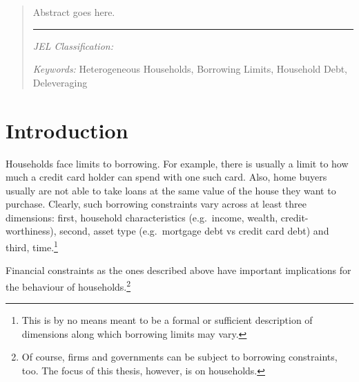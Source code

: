 \documentclass[12pt]{article} %
\numberwithin{equation}{section} %
\begin{document}
\newpage
\begin{abstract} %
Abstract goes here.

\begin{center}
\rule{10cm}{0.4pt}
\end{center}

\noindent
\textit{JEL Classification:}

\noindent
\textit{Keywords:} Heterogeneous Households, Borrowing Limits, Household Debt, Deleveraging
\end{abstract}

\newpage
{} %
\pagestyle{fancy}
\fancyhf{}
\fancyhead[C]{\leftmark}
\fancyfoot[C]{\thepage}

\thispagestyle{plain}
\section{Introduction}
\label{sec:introduction}

Households face limits to borrowing. For example, there is usually a limit to how much a credit card holder can spend with one such card. Also, home buyers usually are not able to take loans at the same value of the house they want to purchase. Clearly, such borrowing constraints vary across at least three dimensions: first, household characteristics (e.g.~income, wealth, credit-worthiness), second, asset type (e.g.~mortgage debt vs credit card debt) and third, time.\footnote{This is by no means meant to be a formal or sufficient description of dimensions along which borrowing limits may vary.}

Financial constraints as the ones described above have important implications for the behaviour of households.\footnote{Of course, firms and governments can be subject to borrowing constraints, too. The focus of this thesis, however, is on households.} 
\end{document}
